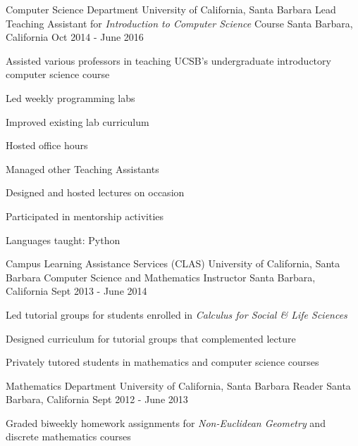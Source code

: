 \begin{cventries}
  \cventry
{Computer Science Department \newline University of California, Santa Barbara}
    {Lead Teaching Assistant for \emph{Introduction to Computer Science} Course}
    {Santa Barbara, California}
    {Oct 2014 - June 2016}
    {
      \begin{cvitems}
	\item {Assisted various professors in teaching UCSB's undergraduate introductory computer science course}\\
	 \begin{cvitems}
        \item {Led weekly programming labs}
        \item Improved existing lab curriculum
        \item {Hosted office hours}
        \item {Managed other Teaching Assistants}
	\item {Designed and hosted lectures on occasion}
	\end{cvitems}
	\vspace{2mm}
	\item Participated in mentorship activities
	\item Languages taught: Python
      \end{cvitems}
    }

  \cventry
{Campus Learning Assistance Services (CLAS) \newline University of California, Santa Barbara}
    {Computer Science and Mathematics Instructor}
    {Santa Barbara, California}
    {Sept 2013 - June 2014}
    {
      \begin{cvitems}
	\item {Led tutorial groups for students enrolled in \emph{Calculus for Social \& Life Sciences}}
	\item {Designed curriculum for tutorial groups that complemented lecture}
        \item {Privately tutored students in mathematics and computer science courses}
      \end{cvitems}
    }

  \cventry
{Mathematics Department \newline University of California, Santa Barbara}
    {Reader}
    {Santa Barbara, California}
    {Sept 2012 - June 2013}
    {
      \begin{cvitems}
	\item {Graded biweekly homework assignments for \emph{Non-Euclidean Geometry} and discrete mathematics courses}
      \end{cvitems}
    }



  \end{cventries}
